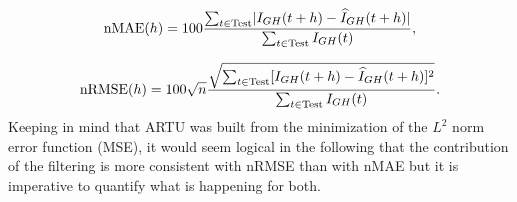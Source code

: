 \begin{equation}
\label{eq:nmae}
    \textnormal{nMAE}(h)=100\frac{\sum_{t \in \textnormal{Test}}\lvert I_{GH}(t+h)-\widehat{I}_{GH}(t+h)\lvert}{\sum_{t \in \textnormal{Test}} I_{GH}(t)},
\end{equation}

\begin{equation}
\label{eq:nrmse}
    \textnormal{nRMSE}(h)=100\sqrt{n}\frac{\sqrt{\sum_{t \in \textnormal{Test}}[ I_{GH}(t+h)-\widehat{I}_{GH}(t+h)]^2}}{\sum_{t \in \textnormal{Test}} I_{GH}(t)}.
\end{equation}
Keeping in mind that ARTU was built from the minimization of the $L^2$ norm error function (MSE), it would seem logical in the following that the contribution of the filtering is more consistent with nRMSE than with nMAE but it is imperative to quantify what is happening for both.